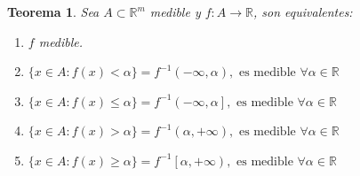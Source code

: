 \documentclass[10pt,a4paper,openright]{book}
\theoremstyle{break}
\newtheorem*{theo}{Teorema}
\begin{document}
\begin{theo}
Sea $A \subset  \mathbb{R}^m$ medible y $f: A \rightarrow \mathbb{R}$, son equivalentes:
\begin{enumerate}
    \item $f$ medible.
    \item $\{x \in A : f\left( x \right) < \alpha\} = f^{-1}\left( -\infty, \alpha \right), \mbox{ es medible }\forall \alpha \in \mathbb{R}$
    \item $\{x \in A : f\left( x \right) \le \alpha\} = f^{-1}\left( -\infty, \alpha \right], \mbox{ es medible }\forall \alpha \in \mathbb{R}$
    \item $\{x \in A : f\left( x \right) > \alpha\} = f^{-1}\left( \alpha, +\infty \right), \mbox{ es medible }\forall \alpha \in \mathbb{R}$
    \item $\{x \in A : f\left( x \right) \ge \alpha\} = f^{-1}\left[ \alpha, +\infty \right), \mbox{ es medible }\forall \alpha \in \mathbb{R}$
\end{enumerate}
\end{theo}
\end{document}

